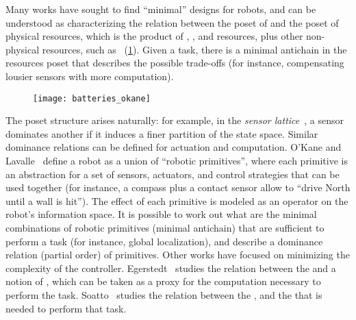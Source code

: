 Many works have sought to find ``minimal'' designs for robots, and
can be understood as characterizing the relation between the poset
of  and the poset of physical resources, which is the product
of , , and  resources,
plus other non-physical resources, such as ~(\cref{fig:robot-generic}).
Given a task, there is a minimal antichain in the resources poset
that describes the possible trade-offs (for instance, compensating lousier
sensors with more computation).

\begin{figure}
    \centering
    \texttt{[image: batteries\_okane]}
    \caption{}
    \label{fig:robot-generic}
\end{figure}





The poset structure arises naturally: for example, in the \emph{sensor
lattice}~\cite{lavalle12sensing}, a sensor dominates another
if it induces a finer partition of the state space. Similar dominance
relations can be defined for actuation and computation. O'Kane and
Lavalle~\cite{okane08comparing} define a robot as a union of ``robotic
primitives'', where each primitive is an abstraction for a set of
sensors, actuators, and control strategies that can be used together
(for instance, a compass plus a contact sensor allow to ``drive North until
a wall is hit''). The effect of each primitive is modeled as an operator
on the robot's information space. It is possible to work out what
are the minimal combinations of robotic primitives (minimal antichain)
that are sufficient to perform a task (for instance, global localization),
and describe a dominance relation (partial order) of primitives. Other
works have focused on minimizing the complexity of the controller.
Egerstedt~\cite{egerstedt03motion} studies the relation between
the  and a notion of , which can be taken as
a proxy for the computation necessary to perform the task. Soatto~\cite{soatto11steps}
studies the relation between the ,
and the  that is needed to perform that
task.


\begin{example}
\end{example}
